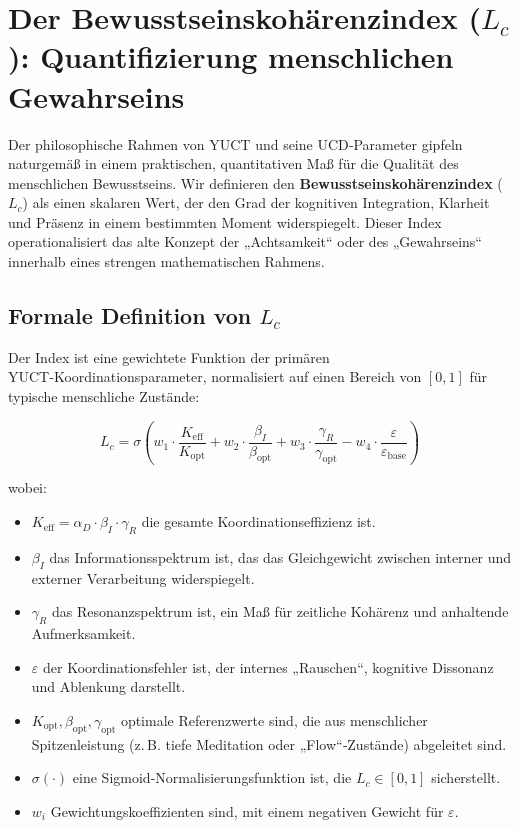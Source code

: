 \documentclass[12pt,a4paper]{article}
\begin{document}
	
	\section{Der Bewusstseinskohärenzindex (\(L_c\)): Quantifizierung menschlichen Gewahrseins}
	
	Der philosophische Rahmen von YUCT und seine UCD‑Parameter gipfeln naturgemäß in einem praktischen, quantitativen Maß für die Qualität des menschlichen Bewusstseins. Wir definieren den \textbf{Bewusstseinskohärenzindex} (\(L_c\)) als einen skalaren Wert, der den Grad der kognitiven Integration, Klarheit und Präsenz in einem bestimmten Moment widerspiegelt. Dieser Index operationalisiert das alte Konzept der „Achtsamkeit“ oder des „Gewahrseins“ innerhalb eines strengen mathematischen Rahmens.
	
	\subsection{Formale Definition von \(L_c\)}
	
	Der Index ist eine gewichtete Funktion der primären YUCT‑Koordinationsparameter, normalisiert auf einen Bereich von \([0, 1]\) für typische menschliche Zustände:
	
	\begin{equation}
		L_c = \sigma\left( w_1 \cdot \frac{K_{\mathrm{eff}}}{K_{\mathrm{opt}}} + w_2 \cdot \frac{\beta_I}{\beta_{\mathrm{opt}}} + w_3 \cdot \frac{\gamma_R}{\gamma_{\mathrm{opt}}} - w_4 \cdot \frac{\varepsilon}{\varepsilon_{\mathrm{base}}} \right)
	\end{equation}
	
	wobei:
	\begin{itemize}
		\item \(K_{\mathrm{eff}} = \alpha_D \cdot \beta_I \cdot \gamma_R\) die gesamte Koordinationseffizienz ist.
		\item \(\beta_I\) das Informationsspektrum ist, das das Gleichgewicht zwischen interner und externer Verarbeitung widerspiegelt.
		\item \(\gamma_R\) das Resonanzspektrum ist, ein Maß für zeitliche Kohärenz und anhaltende Aufmerksamkeit.
		\item \(\varepsilon\) der Koordinationsfehler ist, der internes „Rauschen“, kognitive Dissonanz und Ablenkung darstellt.
		\item \(K_{\mathrm{opt}}, \beta_{\mathrm{opt}}, \gamma_{\mathrm{opt}}\) optimale Referenzwerte sind, die aus menschlicher Spitzenleistung (z. B. tiefe Meditation oder „Flow“‑Zustände) abgeleitet sind.
		\item \(\sigma(\cdot)\) eine Sigmoid‑Normalisierungsfunktion ist, die \(L_c \in [0, 1]\) sicherstellt.
		\item \(w_i\) Gewichtungskoeffizienten sind, mit einem negativen Gewicht für \(\varepsilon\).
	\end{itemize}
	
\end{document}
